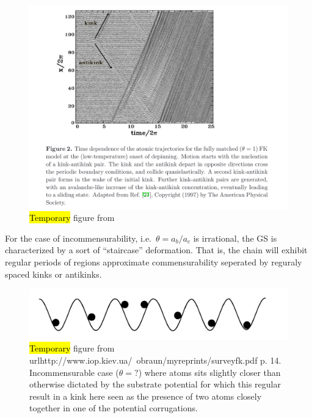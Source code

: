 \begin{figure}[H]
  \centering
  \includegraphics[width=0.8\linewidth]{figures/theory/kink_antikink.png}
  \caption{\hl{Temporary} figure from~\cite{Manini_2016}}
  \label{fig:kink_antikink}
\end{figure}


For the case of incommensurability, i.e.\ $\theta = a_b/a_c$ is irrational, the
\acrshort{GS} is characterized by a sort of ``staircase''  deformation. That is, the chain will exhibit regular periods of regions approximate commensurability seperated by reguraly spaced kinks or antikinks.




\begin{figure}[H]
  \centering
  \includegraphics[width=0.5\linewidth]{figures/theory/incommensurable_example.png}
  \caption{\hl{Temporary} figure from
  url{http://www.iop.kiev.ua/~obraun/myreprints/surveyfk.pdf} p. 14.
  Incommensurable case ($\theta = ?$) where atoms sits slightly closer than
  otherwise dictated by the substrate potential for which this regular result in
  a kink here seen as the presence of two atoms closely together in one of the
  potential corrugations.}
  \label{fig:incommensurable_example}
\end{figure}

